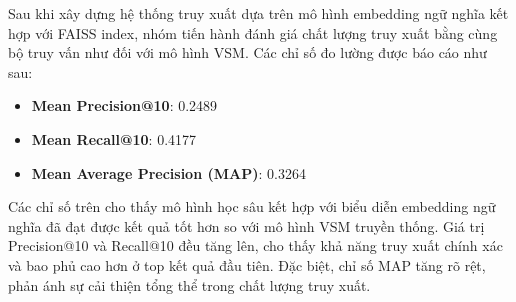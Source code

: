 Sau khi xây dựng hệ thống truy xuất dựa trên mô hình embedding ngữ nghĩa kết hợp với FAISS index, nhóm tiến hành đánh giá chất lượng truy xuất bằng cùng bộ truy vấn như đối với mô hình VSM. Các chỉ số đo lường được báo cáo như sau:

\begin{itemize}
    \item \textbf{Mean Precision@10}: 0.2489
    \item \textbf{Mean Recall@10}: 0.4177
    \item \textbf{Mean Average Precision (MAP)}: 0.3264
\end{itemize}

Các chỉ số trên cho thấy mô hình học sâu kết hợp với biểu diễn embedding ngữ nghĩa đã đạt được kết quả tốt hơn so với mô hình VSM truyền thống. Giá trị Precision@10 và Recall@10 đều tăng lên, cho thấy khả năng truy xuất chính xác và bao phủ cao hơn ở top kết quả đầu tiên. Đặc biệt, chỉ số MAP tăng rõ rệt, phản ánh sự cải thiện tổng thể trong chất lượng truy xuất.
